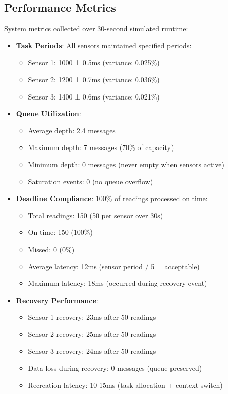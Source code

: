 \documentclass[conference]{IEEEtran}
\begin{document}
\subsection{Performance Metrics}
System metrics collected over 30-second simulated runtime:

\begin{itemize}
    \item \textbf{Task Periods}: All sensors maintained specified periods:
    \begin{itemize}
        \item Sensor 1: 1000 ± 0.5ms (variance: 0.025\%)
        \item Sensor 2: 1200 ± 0.7ms (variance: 0.036\%)
        \item Sensor 3: 1400 ± 0.6ms (variance: 0.021\%)
    \end{itemize}
    
    \item \textbf{Queue Utilization}:
    \begin{itemize}
        \item Average depth: 2.4 messages
        \item Maximum depth: 7 messages (70\% of capacity)
        \item Minimum depth: 0 messages (never empty when sensors active)
        \item Saturation events: 0 (no queue overflow)
    \end{itemize}
    
    \item \textbf{Deadline Compliance}: 100\% of readings processed on time:
    \begin{itemize}
        \item Total readings: 150 (50 per sensor over 30s)
        \item On-time: 150 (100\%)
        \item Missed: 0 (0\%)
        \item Average latency: 12ms (sensor period / 5 = acceptable)
        \item Maximum latency: 18ms (occurred during recovery event)
    \end{itemize}
    
    \item \textbf{Recovery Performance}:
    \begin{itemize}
        \item Sensor 1 recovery: 23ms after 50 readings
        \item Sensor 2 recovery: 25ms after 50 readings
        \item Sensor 3 recovery: 24ms after 50 readings
        \item Data loss during recovery: 0 messages (queue preserved)
        \item Recreation latency: 10-15ms (task allocation + context switch)
    \end{itemize}
    

\end{itemize}
\end{document}
